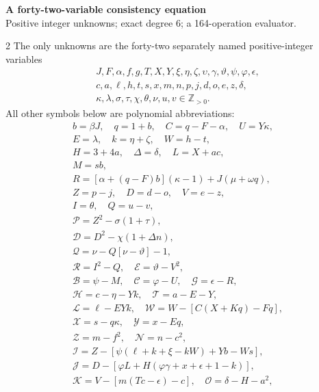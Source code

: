 \documentclass[10pt]{article}
\begin{document}
\begin{center}
{\large\bfseries A forty-two-variable consistency equation}\\[-1pt]
{\small Positive integer unknowns; exact degree 6; a 164-operation evaluator.}
\end{center}\vspace{-8pt}
\begin{multicols}{2}
\fontsize{8.6}{9.1}\selectfont
The only unknowns are the forty-two separately named positive-integer variables
\[
\begin{gathered}J,F,\alpha,f,g,T,X,Y,\xi,\eta,\zeta,\upsilon,\gamma,\vartheta,\psi,\varphi,\epsilon,\\
c,a,\ell,h,t,s,x,m,n,p,j,d,o,e,z,\delta,\\
\kappa,\lambda,\sigma,\tau,\chi,\theta,\nu,u,v\in\mathbb Z_{>0}.\end{gathered}
\]
All other symbols below are polynomial abbreviations:
\[
\begin{gathered}
b=\beta J,\quad q=1+b,\quad C=q-F-\alpha,\quad U=Y\kappa,\\
E=\lambda,\quad k=\eta+\zeta,\quad W=h-t,\\
H=3+4a,\quad\Delta=\delta,\quad L=X+ac,\\
M=sb,\\
R=[\alpha+(q-F)b](\kappa-1)+J(\mu+\omega q),\\
Z=p-j,\quad D=d-o,\quad V=e-z,\\
I=\theta,\quad Q=u-v,\\
\mathcal{P}=Z^2-\sigma(1+\tau),\\
\mathcal{D}=D^2-\chi(1+\Delta n),\\
\mathcal{Q}=\nu-Q[\nu-\vartheta]-1,\\
\mathcal{R}=I^2-Q,\quad \mathcal{E}=\vartheta-V^2,\\
\mathcal{B}=\psi-M,\quad \mathcal{C}=\varphi-U,\quad \mathcal{G}=\epsilon-R,\\
\mathcal{H}=c-\eta-Yk,\quad \mathcal{T}=a-E-Y,\\
\mathcal{L}=\ell-EYk,\quad \mathcal{W}=W-[C(X+Kq)-Fq],\\
\mathcal{X}=s-q\kappa,\quad \mathcal{Y}=x-Eq,\\
\mathcal{Z}=m-f^2,\quad \mathcal{N}=n-c^2,\\
\mathcal{I}=Z-[\psi(\ell+k+\xi-kW)+Yb-Ws],\\
\mathcal{J}=D-[\varphi L+H(\varphi\gamma+x+\epsilon+1-k)],\\
\mathcal{K}=V-[m(Tc-\epsilon)-c],\quad\mathcal{O}=\delta-H-a^2,\\

\end{gathered}\]
\end{multicols}
\end{document}
